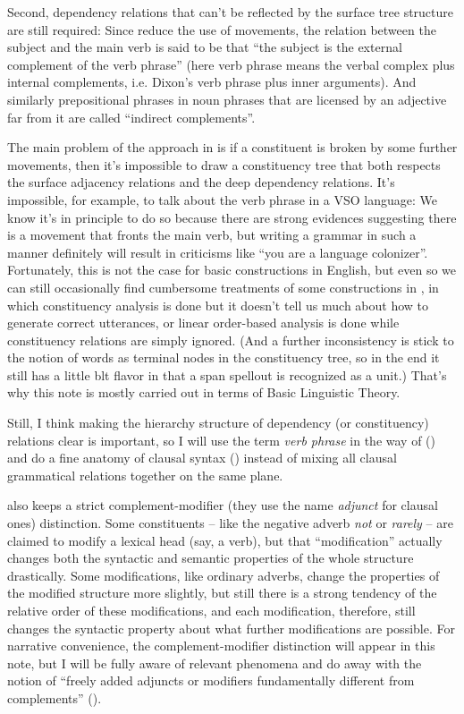 \documentclass[UTF8, a4paper, oneside, scheme=plain]{ctexrep}
\newcommand*{\term}[1]{\emph{#1}}
\newcommand{\corpus}[1]{\emph{#1}}
\begin{document}
Second, dependency relations that can't be reflected by the surface tree structure are still required:
Since \citet{cgel} reduce the use of movements,
the relation between the subject and the main verb 
is said to be that ``the subject is the external complement of the verb phrase''
(here verb phrase means the verbal complex plus internal complements,
i.e. Dixon's verb phrase plus inner arguments).
And similarly prepositional phrases in noun phrases that are licensed by an adjective far from it 
are called ``indirect complements''.

The main problem of the approach in \citet{cgel} is 
if a constituent is broken by some further movements,
then it's impossible to draw a constituency tree that 
both respects the surface adjacency relations 
and the deep dependency relations.
It's impossible, for example, to talk about the verb phrase in a VSO language:
We know it's in principle to do so because
there are strong evidences suggesting there is a movement that fronts the main verb,
but writing a grammar in such a manner definitely will result in criticisms like 
``you are a language colonizer''.
Fortunately, this is not the case for basic constructions in English,
but even so we can still occasionally find cumbersome treatments of some constructions in \citet{cgel},
in which constituency analysis is done but it doesn't tell us much about 
how to generate correct utterances,
or linear order-based analysis is done while constituency relations are simply ignored.
(And a further inconsistency is \citet{cgel} stick 
to the notion of words as terminal nodes in the constituency tree,
so in the end it still has a little \acl{blt} flavor 
in that a span spellout is recognized as a unit.)
That's why this note is mostly carried out in terms of Basic Linguistic Theory.

Still, I think making the hierarchy structure of dependency (or constituency) relations clear 
is important,
so I will use the term \term{verb phrase} in the way of \citet{cgel} ()
and do a fine anatomy of clausal syntax ()
instead of mixing all clausal grammatical relations together on the same plane.

\cite{cgel} also keeps a strict complement-modifier 
(they use the name \term{adjunct} for clausal ones) distinction.
Some constituents -- like the negative adverb \corpus{not} or \corpus{rarely} -- 
are claimed to modify a lexical head (say, a verb),
but that ``modification'' actually changes 
both the syntactic and semantic properties of the whole structure drastically.
Some modifications, like ordinary adverbs,
change the properties of the modified structure more slightly,
but still there is a strong tendency of the relative order of these modifications,
and each modification, therefore, still changes the syntactic property 
about what further modifications are possible.
For narrative convenience, the complement-modifier distinction will appear in this note,
but I will be fully aware of relevant phenomena
and do away with the notion of 
``freely added adjuncts or modifiers fundamentally different from complements'' ().
\end{document}
